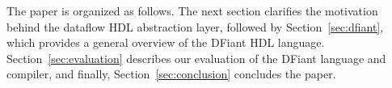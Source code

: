 The paper is organized as follows. The next section clarifies the motivation behind the dataflow HDL abstraction layer, followed by Section~\ref{sec:dfiant}, which provides a general overview of the DFiant HDL language. 
Section~\ref{sec:evaluation} describes our evaluation of the DFiant language and compiler, and finally, Section~\ref{sec:conclusion} concludes the paper.


 